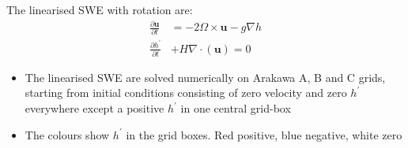 The linearised SWE with rotation are:
\begin{align*}
\frac{\partial\mathbf{u}}{\partial t} & =-2\Omega\times\mathbf{u}-g\nabla h\\
\frac{\partial h^{\prime}}{\partial t} & +H\nabla\cdot(\mathbf{u})=0
\end{align*}

\begin{itemize}
\item The linearised SWE are solved numerically on Arakawa A, B and C grids,
starting from initial conditions consisting of zero velocity and zero
$h^{\prime}$ everywhere except a positive $h^{\prime}$ in one central
grid-box
\item The colours show $h^{\prime}$ in the grid boxes. Red positive, blue
negative, white zero
\end{itemize}
